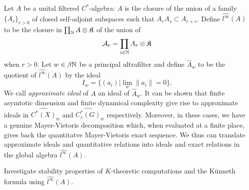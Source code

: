 Let $A$ be a unital filtered $C^*$-algebra: $A$ is the closure of the union of a family  $\{A_r\}_{r>0}$ of closed self-adjoint subspaces such that $A_r A_s \subset A_{r+s}$. Define $\hat {l^\infty} (A)$ to be the closure in $\prod_{\mathbb{N}} A \otimes \mathfrak K$ of the union of 
\[\mathcal A_r = \prod_{i\in \mathbb{N}} A_r \otimes \mathfrak K \]
when $r>0$. Let $w\in \beta \mathbb{N}$ be a principal ultrafilter and define $\hat A_w$ to be the quotient of $\hat {l^\infty} (A)$ by the ideal 
\[ I_w = \{ (a_i) | \lim_w \|a_i \| = 0\}.\]
We call \textit{approximate ideal} of $A$ an ideal of $\hat A_w$. It can be shown that finite asymtotic dimension and finite dynamical complexity give rise to approximate ideals in $\hat{C^*(X)}_w$ and $\hat{C_r^*(G)}_w$ respectively. Moreover, in these cases, we have a genuine Mayer-Vietoris decomposition which, when evaluated at a finite place, gives back the quantitatve Mayer-Vietoris exact sequence. We thus can translate approximate ideals and quantitative relations into ideals and exact relations in the global algebra $\hat {l^\infty} (A)$.  

\begin{project}
Investigate stability properties of $K$-theoretic computations and the K\"unneth formula using $\hat {l^\infty} (A)$.
\end{project}  



























